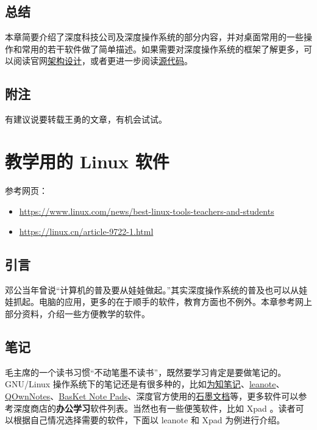 \documentclass[doctor,openright,twoside]{sjtuthesis}
\providecommand{\tightlist}{%
    \setlength{\itemsep}{0pt}\setlength{\parskip}{0pt}}
\theoremstyle{plain}
\theoremstyle{definition}
\theoremstyle{remark}
\theoremstyle{ocrenumbox}
\theoremstyle{plain}
\begin{document}
\hypertarget{-2}{%
\section{总结}\label{-2}}

本章简要介绍了深度科技公司及深度操作系统的部分内容，并对桌面常用的一些操作和常用的若干软件做了简单描述。如果需要对深度操作系统的框架了解更多，可以阅读官网\href{https://www.deepin.org/developer-community/architectural-design/}{架构设计}，或者更进一步阅读\href{https://github.com/linuxdeepin}{源代码}。

\section{附注}

有建议说要转载王勇的文章，有机会试试。

\hypertarget{chap:education-intro}{%
\chapter{教学用的 Linux 软件}\label{chap:education-intro}}

参考网页：

\begin{itemize}
\tightlist
\item
  \url{https://www.linux.com/news/best-linux-tools-teachers-and-students}
\item
  \url{https://linux.cn/article-9722-1.html}
\end{itemize}

\section{引言}

邓公当年曾说``计算机的普及要从娃娃做起。''其实深度操作系统的普及也可以从娃娃抓起。电脑的应用，更多的在于顺手的软件，教育方面也不例外。本章参考网上部分资料，介绍一些方便教学的软件。

\section{笔记}

毛主席的一个读书习惯``不动笔墨不读书''，既然要学习肯定是要做笔记的。GNU/Linux
操作系统下的笔记还是有很多种的，比如\href{http://www.wiz.cn/}{为知笔记}、\href{http://leanote.org/}{leanote}、\href{http://www.qownnotes.org/}{QOwnNotes}、\href{http://basket.kde.org}{BasKet
Note
Pads}、深度官方使用的\href{https://shimo.im/}{石墨文档}等，更多软件可以参考深度商店的\textbf{办公学习}软件列表。当然也有一些便笺软件，比如
Xpad 。读者可以根据自己情况选择需要的软件，下面以 leanote 和 Xpad
为例进行介绍。
\end{document}
